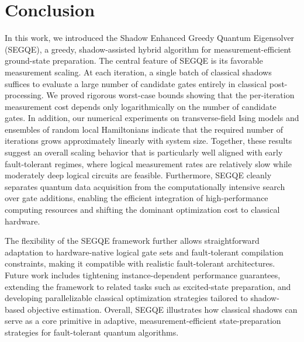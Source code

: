 \section{Conclusion}
\label{sec:conclusion}
In this work, we introduced the Shadow Enhanced Greedy Quantum Eigensolver (SEGQE), a greedy, shadow-assisted hybrid algorithm for measurement-efficient ground-state preparation. 
The central feature of SEGQE is its favorable measurement scaling. At each iteration, a single batch of classical shadows suffices to evaluate a large number of candidate gates entirely in classical post-processing. We proved rigorous worst-case bounds showing that the per-iteration measurement cost depends only logarithmically on the number of candidate gates. In addition, our numerical experiments on transverse-field Ising models and ensembles of random local Hamiltonians indicate that the required number of iterations grows approximately linearly with system size. Together, these results suggest an overall scaling behavior that is particularly well aligned with early fault-tolerant regimes, where logical measurement rates are relatively slow while moderately deep logical circuits are feasible.
Furthermore, SEGQE cleanly separates quantum data acquisition from the computationally intensive search over gate additions, enabling the efficient integration of high-performance computing resources and shifting the dominant optimization cost to classical hardware. 

The flexibility of the SEGQE framework further allows straightforward adaptation to hardware-native logical gate sets and fault-tolerant compilation constraints, making it compatible with realistic fault-tolerant architectures. Future work includes tightening instance-dependent performance guarantees, extending the framework to related tasks such as excited-state preparation, and developing parallelizable classical optimization strategies tailored to shadow-based objective estimation.
Overall, SEGQE illustrates how classical shadows can serve as a core primitive in adaptive, measurement-efficient state-preparation strategies for fault-tolerant quantum algorithms.
